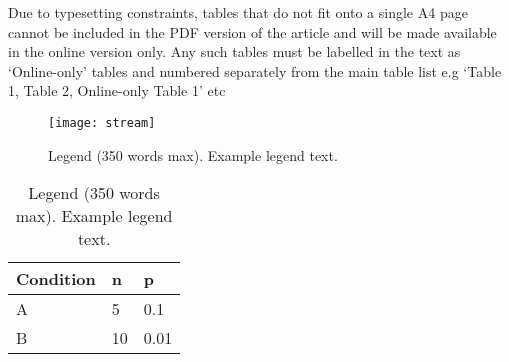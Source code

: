 \documentclass[fleqn,10pt]{wlscirep}
\begin{document}
Due to typesetting constraints, tables that do not fit onto a single A4 page cannot be included in the PDF version of the article and will be made available in the online version only.
Any such tables must be labelled in the text as ‘Online-only’ tables and numbered separately from the main table list e.g 
‘Table 1, Table 2, Online-only Table 1’ etc


\begin{figure}[ht]
\centering
\texttt{[image: stream]}
\caption{Legend (350 words max).
Example legend text.}
\label{fig:stream}
\end{figure}

\begin{table}[ht]
\centering
\begin{tabular}{|l|l|l|}
\hline
Condition & n & p \\
\hline
A & 5 & 0.1 \\
\hline
B & 10 & 0.01 \\
\hline
\end{tabular}
\caption{\label{tab:example}Legend (350 words max).
Example legend text.}
\end{table}
\end{document}
